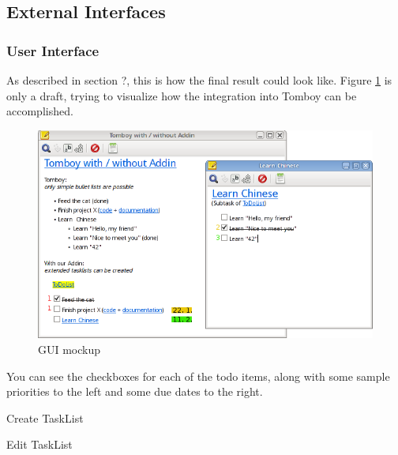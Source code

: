 \subsection{External Interfaces}
\label{requirements:interfaces}


\subsubsection{User Interface} %
\label{requirements:interfaces:user}
        
As described in section ?, this is how the final result could look like. Figure \ref{gui} is only a draft, trying to visualize how the integration into Tomboy can be accomplished.
\begin{figure}[h]
  \includegraphics[width=\textwidth]{graphics/Screenshot_cropped_edited.png}
  \caption{GUI mockup}
  \label{gui}
\end{figure}

You can see the checkboxes for each of the todo items, along with some sample priorities to the left and some due dates to the right.

\begin{requirement}{Create TaskList}
\end{requirement}

\begin{requirement}{Edit TaskList}
\end{requirement}

